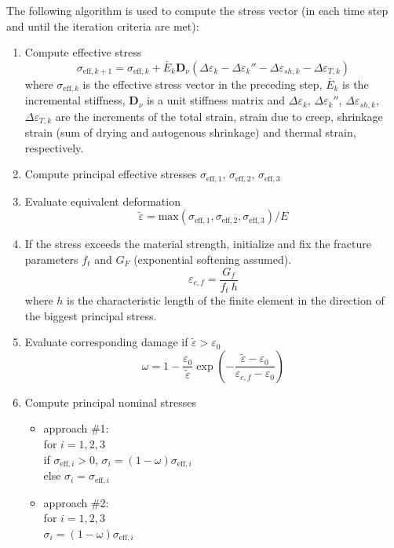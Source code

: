 \documentclass[a4paper]{article}
\begin{document}
The following algorithm is used to compute the stress vector (in each time step and until the iteration criteria are met):
\begin{enumerate}

\item{Compute effective stress}
\begin{equation}
\sigma_{\mathrm{eff},k+1} = \sigma_{\mathrm{eff},k} + \bar{E}_k \boldsymbol{D}_\nu (\Delta \varepsilon_k - \Delta \varepsilon_k'' - \Delta \varepsilon_{sh,k} - \Delta \varepsilon_{T,k})
\end{equation}
%
where $\sigma_{\mathrm{eff},k}$ is the effective stress vector in the preceding step, $\bar{E}_k$ is the incremental stiffness, $\boldsymbol{D}_\nu$ is a unit stiffness matrix and $\Delta \varepsilon_k$, $\Delta \varepsilon_k''$, $\Delta \varepsilon_{sh,k}$, $\Delta \varepsilon_{T,k}$ are the increments of the total strain, strain due to creep, shrinkage strain (sum of drying and autogenous shrinkage) and thermal strain, respectively.


\item{Compute principal effective stresses $\sigma_{\mathrm{eff,1}}$, $\sigma_{\mathrm{eff,2}}$, $\sigma_{\mathrm{eff,3}}$}

\item{Evaluate equivalent deformation}
\begin{equation}
\tilde \varepsilon = \mathrm{max}(\sigma_{\mathrm{eff,1}}, \sigma_{\mathrm{eff,2}}, \sigma_{\mathrm{eff,3}})/E
\end{equation}

\item If the stress exceeds the material strength, initialize and fix the fracture parameters $f_t$ and $G_F$ (exponential softening assumed).
%
\begin{equation}
\varepsilon_{c,f} = \frac{G_f}{f_t \: h}
\end{equation}
%
where $h$ is the characteristic length of the finite element in the direction of the biggest principal stress. 

\item{Evaluate corresponding damage}
%
if $\tilde \varepsilon > \varepsilon_0$
\begin{equation}
\omega = 1 - \frac{\varepsilon_0}{\tilde \varepsilon} \exp \left(-\frac{\tilde \varepsilon - \varepsilon_0}{\varepsilon_{c,f} - \varepsilon_0} \right)
\end{equation}


\item{Compute principal nominal stresses}
\begin{itemize}
\item approach \#1:\\
for $i = 1, 2, 3$\\
if $\sigma_{\mathrm{eff},i} > 0$, $\sigma_{i} = (1-\omega) \sigma_{\mathrm{eff},i} $\\
else $\sigma_{i} = \sigma_{\mathrm{eff},i}$
\item approach \#2:\\
for $i = 1, 2, 3$\\
$\sigma_{i} = (1-\omega) \sigma_{\mathrm{eff},i} $
\end{itemize}


\end{enumerate}
\end{document}
